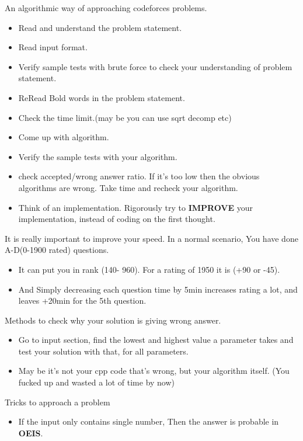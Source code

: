 \documentclass[a4paper,12pt]{report}
\begin{document}
An algorithmic way of approaching codeforces problems.
\begin{itemize}
	\item Read and understand the problem statement.
	\item Read input format.
	\item Verify sample tests with brute force to check your understanding of problem statement.
	\item ReRead Bold words in the problem statement.
	\item Check the time limit.(may be you can use sqrt decomp etc)
	\item Come up with algorithm.
	\item Verify the sample tests with your algorithm.
	\item check accepted/wrong answer ratio. If it's too low then the obvious algorithms are wrong. Take time and recheck your algorithm.
	\item Think of an implementation. Rigorously try to \textbf{IMPROVE} your implementation, instead of coding on the first thought. 
\end{itemize}

It is really important to improve your speed. In a normal scenario, You have done A-D(0-1900 rated) questions.
\begin{itemize}
	\item  It can put you in rank (140- 960). For a rating of 1950 it is 
	(+90 or -45).
	\item And Simply decreasing each question time by 5min increases rating a lot, and leaves +20min for the 5th question.
\end{itemize}

Methods to check why your solution is giving wrong answer.
\begin{itemize}
	\item Go to input section, find the lowest and highest value a parameter takes and test your solution with that, for all parameters.
	\item May be it's not your cpp code that's wrong, but your algorithm itself. (You fucked up and wasted a lot of time by now)
\end{itemize}

Tricks to approach a problem
\begin{itemize}
	\item If the input only contains single number, Then the answer is probable in \textbf{OEIS}.
\end{itemize}











\end{document}
